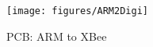 \begin{figure}[H]
\begin{center}
\texttt{[image: figures/ARM2Digi]}
\end{center}
\caption{PCB: ARM to XBee}
\label{fig:ARM2XBee}
\end{figure}
